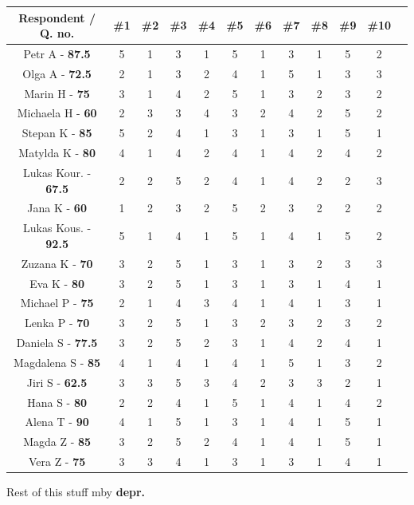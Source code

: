 \begin{tabular}{ |c|c|c|c|c|c|c|c|c|c|c|c| } 
    \hline
    Respondent / Q. no. & \#1 & \#2& \#3& \#4& \#5& \#6& \#7& \#8& \#9& \#10 \\
    \hline
    Petr A - \textbf{87.5}     & 5 & 1& 3& 1& 5& 1& 3& 1& 5& 2 \\ 
    Olga A - \textbf{72.5}     & 2 & 1& 3& 2& 4& 1& 5& 1& 3& 3 \\ 
    Marin H - \textbf{75}    & 3 & 1& 4& 2& 5& 1& 3& 2& 3& 2 \\ 
    Michaela H - \textbf{60} & 2 & 3& 3& 4& 3& 2& 4& 2& 5& 2 \\ 
    Stepan K - \textbf{85}   & 5 & 2& 4& 1& 3& 1& 3& 1& 5& 1 \\ 
    Matylda K - \textbf{80}  & 4 & 1& 4& 2& 4& 1& 4& 2& 4& 2 \\ 
    Lukas Kour. - \textbf{67.5} & 2 & 2& 5& 2& 4& 1& 4& 2& 2& 3 \\ 
    Jana K - \textbf{60}    & 1 & 2& 3& 2& 5& 2& 3& 2& 2& 2 \\ 
    Lukas Kous. - \textbf{92.5} & 5 & 1& 4& 1& 5& 1& 4& 1& 5& 2 \\ 
    Zuzana K - \textbf{70}   & 3 & 2& 5& 1& 3& 1& 3& 2& 3& 3 \\ 
    Eva K - \textbf{80}      & 3 & 2& 5& 1& 3& 1& 3& 1& 4& 1 \\ 
    Michael P - \textbf{75}  & 2 & 1& 4& 3& 4& 1& 4& 1& 3& 1 \\ 
    Lenka P - \textbf{70}    & 3 & 2& 5& 1& 3& 2& 3& 2& 3& 2 \\ 
    Daniela S - \textbf{77.5}  & 3 & 2& 5& 2& 3& 1& 4& 2& 4& 1 \\ 
    Magdalena S - \textbf{85} & 4 & 1& 4& 1& 4& 1& 5& 1& 3& 2 \\ 
    Jiri S - \textbf{62.5}     & 3 & 3& 5& 3& 4& 2& 3& 3& 2& 1 \\ 
    Hana S - \textbf{80}     & 2 & 2& 4& 1& 5& 1& 4& 1& 4& 2 \\ 
    Alena T - \textbf{90}    & 4 & 1& 5& 1& 3& 1& 4& 1& 5& 1 \\ 
    Magda Z - \textbf{85}    & 3 & 2& 5& 2& 4& 1& 4& 1& 5& 1 \\ 
    Vera Z - \textbf{75}     & 3 & 3& 4& 1& 3& 1& 3& 1& 4& 1 \\ 
    \hline
\end{tabular}
\newpage
Rest of this stuff mby \textbf{depr.}
